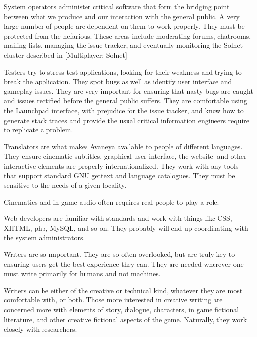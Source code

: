 System operators administer critical software that form the bridging point between what we produce and our interaction with the general public. A very large number of people are dependent on them to work properly. They must be protected from the nefarious. These areas include moderating forums, chatrooms, mailing lists, managing the issue tracker, and eventually monitoring the Solnet cluster described in [Multiplayer: Solnet].


Testers try to stress test applications, looking for their weakness and trying to break the application. They spot bugs as well as identify user interface and gameplay issues. They are very important for ensuring that nasty bugs are caught and issues rectified before the general public suffers. They are comfortable using the Launchpad interface, with prejudice for the issue tracker, and know how to generate stack traces and provide the usual critical information engineers require to replicate a problem.


Translators are what makes Avaneya available to people of different languages. They ensure cinematic subtitles, graphical user interface, the website, and other interactive elements are properly internationalized. They work with any tools that support standard GNU gettext and language catalogues. They must be sensitive to the needs of a given locality.


Cinematics and in game audio often requires real people to play a role.


Web developers are familiar with standards and work with things like CSS, XHTML, php, MySQL, and so on. They probably will end up coordinating with the system administrators.


Writers are so important. They are so often overlooked, but are truly key to ensuring users get the best experience they can. They are needed wherever one must write primarily for humans and not machines.

Writers can be either of the creative or technical kind, whatever they are most comfortable with, or both. Those more interested in creative writing are concerned more with elements of story, dialogue, characters, in game fictional literature, and other creative fictional aspects of the game. Naturally, they work closely with researchers.

